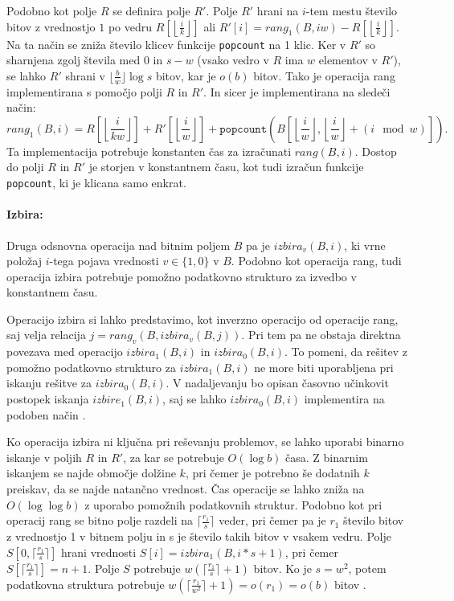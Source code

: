 Podobno kot polje $R$ se definira polje $R'$. Polje $R'$ hrani na $i$-tem mestu število bitov z vrednostjo $1$ po vedru $R[\left\lfloor\frac{i}{k} \right\rfloor]$ ali $R'[i]=rang_1(B,iw)-R[\left\lfloor\frac{i}{k} \right\rfloor]$. Na ta način se zniža število klicev funkcije \texttt{popcount} na 1 klic. Ker v $R'$ so sharnjena zgolj števila med 0 in $s-w$ (vsako vedro v $R$ ima $w$ elementov v $R'$), se lahko $R'$ shrani v $\lfloor\frac{b}{w}\rfloor\log{s}$ bitov, kar je $o(b)$ bitov. Tako je operacija rang implementirana s pomočjo polji $R$ in $R'$. In sicer je implementirana na sledeči način:
\begin{equation}
    rang_1(B,i)=R\left[\left\lfloor\frac{i}{kw} \right\rfloor\right]+ R'\left[\left\lfloor\frac{i}{w} \right\rfloor\right]+\texttt{popcount}\left(B\left[\left\lfloor\frac{i}{w} \right\rfloor,\left\lfloor\frac{i}{w} \right\rfloor+(i \mod w)\right]\right).
\end{equation}
Ta implementacija potrebuje konstanten čas za izračunati $rang(B,i)$. Dostop do polji $R$ in $R'$ je storjen v konstantnem času, kot tudi izračun funkcije \texttt{popcount}, ki je klicana samo enkrat\cite{Navarro2016}.

\paragraph{Izbira:}
Druga odsnovna operacija nad bitnim poljem $B$ pa je $izbira_v(B,i)$, ki vrne položaj $i$-tega pojava vrednosti $v\in\{1,0\}$ v $B$. Podobno kot operacija rang, tudi operacija izbira potrebuje pomožno podatkovno strukturo za izvedbo v konstantnem času. 

Operacijo izbira si lahko predstavimo, kot inverzno operacijo od operacije rang, saj velja relacija $j=rang_v(B,izbira_v(B,j))$. Pri tem pa ne obstaja direktna povezava med operacijo $izbira_1(B,i)$ in $izbira_0(B,i)$. To pomeni, da rešitev z pomožno podatkovno strukturo za $izbira_1(B,i)$ ne more biti uporabljena pri iskanju rešitve za $izbira_0(B,i)$. V nadaljevanju bo opisan časovno učinkovit postopek iskanja $izbire_1(B,i)$, saj se lahko $izbira_0(B,i)$ implementira na podoben način \cite{Navarro2016}.

Ko operacija izbira ni ključna pri reševanju problemov, se lahko uporabi binarno iskanje v poljih $R$ in $R'$, za kar se potrebuje $O(\log{b})$ časa. Z binarnim iskanjem se najde območje dolžine $k$, pri čemer je potrebno še dodatnih $k$ preiskav, da se najde natančno vrednost.
Čas operacije se lahko zniža na $O(\log\log b)$ z uporabo pomožnih podatkovnih struktur. Podobno kot pri operacij rang se bitno polje razdeli na $\lceil \frac{r_1}{s} \rceil$ veder, pri čemer pa je $r_1$ število bitov z vrednostjo 1 v bitnem polju in s je število takih bitov v vsakem vedru. Polje $S[0,\lceil \frac{r_1}{s} \rceil]$ hrani vrednosti $S[i]=izbira_1(B,i*s+1)$, pri čemer $S[\lceil \frac{r_1}{s} \rceil]=n+1$. Polje $S$ potrebuje $w(\lceil \frac{r_1}{s} \rceil +1)$ bitov. Ko je $s=w^2$, potem podatkovna struktura potrebuje $w(\lceil\frac{r_1}{w^2}\rceil+1)=o(r_1)=o(b)$ bitov \cite{Navarro2016}.

